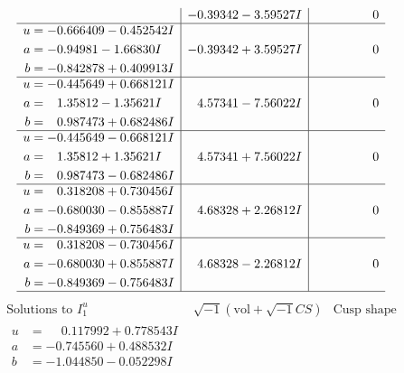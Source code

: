 \documentclass[1p]{elsarticle_modified}
\theoremstyle{definition}
\newcommand{\I}{\sqrt{-1}}
\begin{document}
$$\begin{array}{c|c|c}
 & -0.39342 - 3.59527 I & \phantom{-0.000000 } 0 \\ \hline\begin{aligned}
u &= -0.666409 - 0.452542 I \\
a &= -0.94981 - 1.66830 I \\
b &= -0.842878 + 0.409913 I\end{aligned}
 & -0.39342 + 3.59527 I & \phantom{-0.000000 } 0 \\ \hline\begin{aligned}
u &= -0.445649 + 0.668121 I \\
a &= \phantom{-}1.35812 - 1.35621 I \\
b &= \phantom{-}0.987473 + 0.682486 I\end{aligned}
 & \phantom{-}4.57341 - 7.56022 I & \phantom{-0.000000 } 0 \\ \hline\begin{aligned}
u &= -0.445649 - 0.668121 I \\
a &= \phantom{-}1.35812 + 1.35621 I \\
b &= \phantom{-}0.987473 - 0.682486 I\end{aligned}
 & \phantom{-}4.57341 + 7.56022 I & \phantom{-0.000000 } 0 \\ \hline\begin{aligned}
u &= \phantom{-}0.318208 + 0.730456 I \\
a &= -0.680030 - 0.855887 I \\
b &= -0.849369 + 0.756483 I\end{aligned}
 & \phantom{-}4.68328 + 2.26812 I & \phantom{-0.000000 } 0 \\ \hline\begin{aligned}
u &= \phantom{-}0.318208 - 0.730456 I \\
a &= -0.680030 + 0.855887 I \\
b &= -0.849369 - 0.756483 I\end{aligned}
 & \phantom{-}4.68328 - 2.26812 I & \phantom{-0.000000 } 0\\
 \hline 
 \end{array}$$\newpage$$\begin{array}{c|c|c}  
\text{Solutions to }I^u_{1}& \I (\text{vol} + \sqrt{-1}CS) & \text{Cusp shape}\\
 \hline 
\begin{aligned}
u &= \phantom{-}0.117992 + 0.778543 I \\
a &= -0.745560 + 0.488532 I \\
b &= -1.044850 - 0.052298 I\end{aligned}

\end{array}$$
\end{document}
